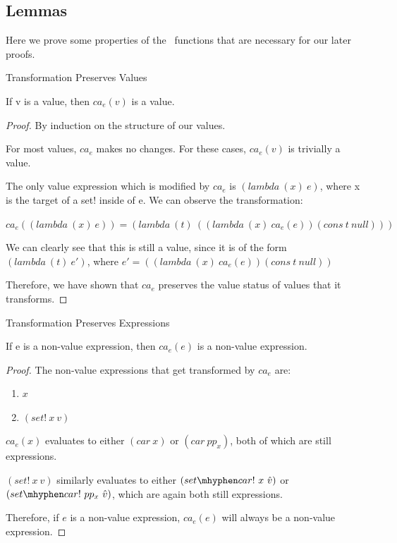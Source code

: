 \subsection{Lemmas}
Here we prove some properties of the \caname\ functions that are necessary for our later proofs.

\begin{lemma}\label{lem:trans_val} Transformation Preserves Values

If v is a value, then $ca_e(v)$ is a value.
\end{lemma}
\begin{proof}
By induction on the structure of our values.

For most values, $ca_e$ makes no changes. For these cases, $ca_e(v)$ is trivially a value.

The only value expression which is modified by $ca_e$ is $(lambda\ (x)\ e)$, where x is the target of a set! inside of e. We can observe the transformation:

$ca_e((lambda\ (x)\ e)) = (lambda\ (t)\ ((lambda\ (x)\ ca_e(e))(cons\ t\ null)))$

We can clearly see that this is still a value, since it is of the form $(lambda\ (t)\ e')$, where $e' = ((lambda\ (x)\ ca_e(e))(cons\ t\ null))$

Therefore, we have shown that $ca_e$ preserves the value status of values that it transforms.
\end{proof}

\begin{lemma}\label{lem:trans_expr} Transformation Preserves Expressions

If e is a non-value expression, then $ca_e(e)$ is a non-value expression.
\end{lemma}
\begin{proof}
The non-value expressions that get transformed by $ca_e$ are:

\begin{enumerate}
    \item $x$
    \item $(set!\ x\ v)$
\end{enumerate}

$ca_e(x)$ evaluates to either $(car\ x)$ or $(car\ pp_x)$, both of which are still expressions.

$(set!\ x\ v)$ similarly evaluates to either $(set \mhyphen car!\ x\ \hat{v})$ or $(set \mhyphen car!\ pp_x\ \hat{v})$, which are again both still expressions.

Therefore, if $e$ is a non-value expression, $ca_e(e)$ will always be a non-value expression.

\end{proof}

